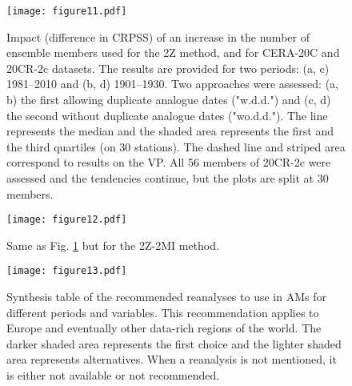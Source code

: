 \documentclass{ametsoc}
\begin{document}
	\begin{figure}[t]
		\noindent\texttt{[image: figure11.pdf]}\\
		\caption{Impact (difference in CRPSS) of an increase in the number of ensemble members used for the 2Z method, and for CERA-20C and 20CR-2c datasets. The results are provided for two periods: (a, c) 1981--2010 and (b, d) 1901--1930. Two approaches were assessed: (a, b) the first allowing duplicate analogue dates ("w.d.d.") and (c, d) the second without duplicate analogue dates ("wo.d.d."). The line represents the median and the shaded area represents the first and the third quartiles (on 30 stations). The dashed line and striped area correspond to results on the VP. All 56 members of 20CR-2c were assessed and the tendencies continue, but the plots are split at 30 members.}
		\label{fig:plot_impact_members_2Z}
	\end{figure}
	
	\begin{figure}[t]
		\noindent\texttt{[image: figure12.pdf]}\\
		\caption{Same as Fig. \ref{fig:plot_impact_members_2Z} but for the 2Z-2MI method.}
		\label{fig:plot_impact_members_2Z-2MI}
	\end{figure}
	
	\begin{figure}[t]
		\noindent\texttt{[image: figure13.pdf]}\\
		\caption{Synthesis table of the recommended reanalyses to use in AMs for different periods and variables. This recommendation applies to Europe and eventually other data-rich regions of the world. The darker shaded area represents the first choice and the lighter shaded area represents alternatives. When a reanalysis is not mentioned, it is either not available or not recommended.}
		\label{fig:synthesis-table}
	\end{figure}
	
\end{document}
